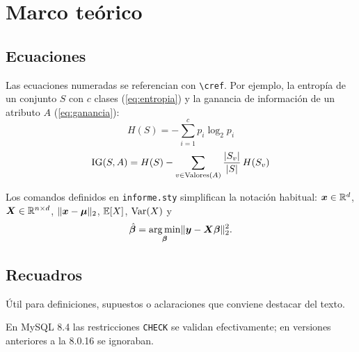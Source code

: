 \section{Marco teórico}
\label{sec:marco}

\subsection{Ecuaciones}

Las ecuaciones numeradas se referencian con \verb|\cref|. Por ejemplo, la entropía de un
conjunto $S$ con $c$ clases (\cref{eq:entropia}) y la ganancia de información de un
atributo $A$ (\cref{eq:ganancia}):
\begin{equation}
  H(S) = -\sum_{i=1}^{c} p_i \log_2 p_i
  \label{eq:entropia}
\end{equation}
\begin{equation}
  \mathrm{IG}(S, A) = H(S) - \sum_{v \in \mathrm{Valores}(A)} \frac{\lvert S_v\rvert}{\lvert S\rvert}\, H(S_v)
  \label{eq:ganancia}
\end{equation}

Los comandos definidos en \texttt{informe.sty} simplifican la notación habitual:
$\bm{x} \in \mathbb{R}^{d}$, $\bm{X} \in \mathbb{R}^{n \times d}$, $\lVert\bm{x} - \bm{\mu}\rVert_2$,
$\operatorname{\mathbb{E}}[X]$, $\operatorname{Var}(X)$ y
\begin{equation*}
  \hat{\bm{\beta}} = \operatorname*{arg\,min}_{\bm{\beta}} \lVert\bm{y} - \bm{X}\bm{\beta}\rVert_2^2 .
\end{equation*}

\subsection{Recuadros}

\begin{nota}
  Útil para definiciones, supuestos o aclaraciones que conviene destacar del texto.
\end{nota}

\begin{importante}
  En MySQL 8.4 las restricciones \texttt{CHECK} se validan efectivamente; en versiones
  anteriores a la 8.0.16 se ignoraban.
\end{importante}
